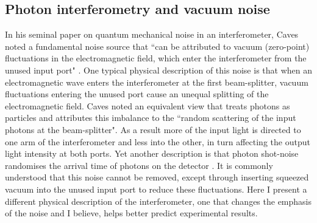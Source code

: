 \documentclass[reqno]{amsart}
\begin{document}
\subsection{Photon interferometry and vacuum noise}\label{App:LIGO}
%
In his seminal paper on quantum mechanical noise in an interferometer, Caves noted a fundamental noise source that ``can be attributed to vacuum (zero-point) fluctuations in the electromagnetic field, which enter the interferometer from the unused input port" \cite{Caves1981}. One typical physical description of this noise is that when an electromagnetic wave enters the interferometer at the first beam-splitter, vacuum fluctuations entering the unused port cause an unequal splitting of the electromagnetic field. Caves noted an equivalent view that treats photons as particles and attributes this imbalance to the ``random scattering of the input photons at the beam-splitter". As a result more of the input light is directed to one arm of the interferometer and less into the other, in turn affecting the output light intensity at both ports. Yet another description is that photon shot-noise randomises the arrival time of photons on the detector \cite{Tse2019}. It is commonly understood that this noise cannot be removed, except through inserting squeezed vacuum into the unused input port to reduce these fluctuations. Here I present a different physical description of the interferometer, one that changes the emphasis of the noise and I believe, helps better predict experimental results.
\end{document}
